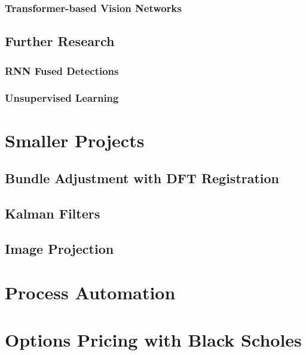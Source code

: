 \documentclass[12pt]{article}
\begin{document}
\subsubsection{Transformer-based Vision Networks}

\subsection{Further Research}
\subsubsection{RNN Fused Detections}

\subsubsection{Unsupervised Learning}

\section{Smaller Projects}
\subsection{Bundle Adjustment with DFT Registration}

\subsection{Kalman Filters}

\subsection{Image Projection}

\section{Process Automation}

\section{Options Pricing with Black Scholes}
\end{document}
